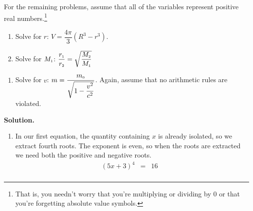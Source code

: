\documentclass{ximera}
\begin{document}
{{{\begin{example}
\begin{multicols}{3}
\begin{enumerate}
\setcounter{HW}{\value{enumi}}
\end{enumerate}
\end{multicols}

For the remaining problems, assume that all of the variables represent positive real numbers.\footnote{That is, you needn't worry that you're multiplying or dividing by $0$ or that you're forgetting absolute value symbols.}

\begin{multicols}{2}
\begin{enumerate}

\setcounter{enumi}{\value{HW}}

\item  Solve for $r$:  $V = \dfrac{4\pi}{3}(R^3 - r^3)$.
\item  Solve for $M_{\text{\tiny$1$}}$:  $\dfrac{r_{\text{\tiny$1$}}}{r_{\text{\tiny$2$}}} = \sqrt{\dfrac{M_{\text{\tiny$2$}}}{M_{\text{\tiny$1$}}}}$


\setcounter{HW}{\value{enumi}}
\end{enumerate}
\end{multicols}

\begin{enumerate}

\setcounter{enumi}{\value{HW}}

\item  Solve for $v$:  $m = \dfrac{m_{\text{\tiny$0$}}}{\sqrt{1 - \dfrac{v^2}{c^2}}}$.  Again, assume that no arithmetic rules are violated.

\setcounter{enumi}{\value{HW}}

\end{enumerate}


{\bf Solution.}

\begin{enumerate}

\item  In our first equation, the quantity containing $x$ is already isolated, so we extract fourth roots. The exponent is even, so when the roots are extracted we need both the positive and negative roots. \[ \begin{array}{rclr}

(5x +3)^{4} & = & 16 & \\ [2pt]


\end{array}\]
\end{enumerate}
\end{example}}}}
\end{document}
